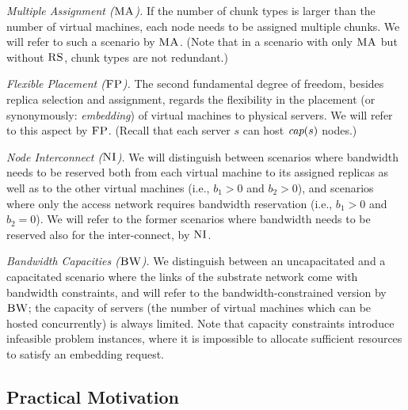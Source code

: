\documentclass[9pt]{sigcomm-alternate}
\newcommand{\maciek}[1]{\textcolor{brown}{maciek: #1}}
\newcommand{\capa}{\emph{cap}}
\newcommand{\CC}{\textsc{NI}}
\newcommand{\FP}{\textsc{FP}}
\newcommand{\RS}{\textsc{RS}}
\newcommand{\BW}{\textsc{BW}}
\newcommand{\MA}{\textsc{MA}}
\newcommand{\CostTrans}{\ensuremath{b_1}}
\newcommand{\CostCom}{\ensuremath{b_2}}
\begin{document}
\emph{Multiple Assignment ($\MA$).}
If the number of chunk types is larger than the number of virtual machines,
each node needs to be assigned multiple chunks. We will refer to such a scenario by $\MA$.
(Note that in a scenario with only $\MA$ but without $\RS$, chunk types are not redundant.)

\emph{Flexible Placement ($\FP$).} The second fundamental degree of freedom, besides replica selection and assignment,
regards the flexibility in the placement (or synonymously: \emph{embedding}) of virtual machines to physical servers.
We will refer to this aspect by $\FP$. (Recall that each server $s$ can host $\capa(s)$ nodes.)


\emph{Node Interconnect ($\CC$).} We will distinguish between scenarios where bandwidth needs to be reserved
both from each virtual machine to its assigned replicas as well as to the other virtual machines
(i.e., $\CostTrans>0$ and $\CostCom>0$), and
 scenarios where only the access network requires bandwidth reservation (i.e., $\CostTrans>0$ and $\CostCom=0$).
 We will refer to the former scenarios
where bandwidth needs to be reserved also for the inter-connect, by $\CC$.

\emph{Bandwidth Capacities ($\BW$).}
We distinguish between an uncapacitated and a capacitated scenario where the links
of the substrate network come with bandwidth
constraints, and will refer to the bandwidth-constrained version by $\BW$; the capacity of servers
(the number of virtual machines which can be hosted concurrently) is always limited.
Note that capacity constraints introduce infeasible problem instances, where it is impossible to
allocate sufficient resources to satisfy an embedding request.


\subsection{Practical Motivation}\label{ssec:practice}
\end{document}
